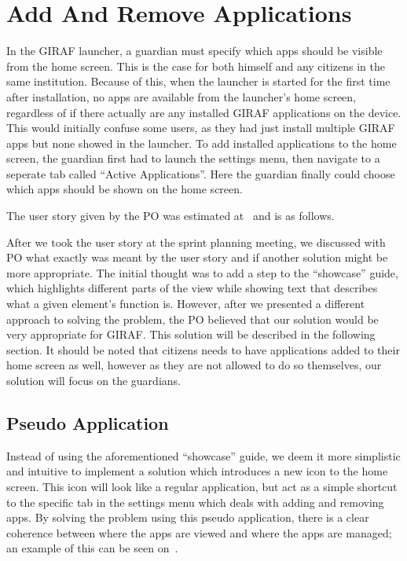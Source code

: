 \section{Add And Remove Applications}
\label{sec:add_and_remove_applications}
In the GIRAF launcher, a guardian must specify which apps should be visible from the home screen.
This is the case for both himself and any citizens in the same institution.
Because of this, when the launcher is started for the first time after installation, no apps are available from the launcher's home screen, regardless of if there actually are any installed GIRAF applications on the device.
This would initially confuse some users, as they had just install multiple GIRAF apps but none showed in the launcher.
To add installed applications to the home screen, the guardian first had to launch the settings menu, then navigate to a seperate tab called \enquote{Active Applications}.
Here the guardian finally could choose which apps should be shown on the home screen.

The user story given by the PO was estimated at \pmedhigh~and is as follows.

After we took the user story at the sprint planning meeting, we discussed with PO what exactly was meant by the user story and if another solution might be more appropriate.
The initial thought was to add a step to the \enquote{showcase} guide, which highlights different parts of the view while showing text that describes what a given element's function is.
However, after we presented a different approach to solving the problem, the PO believed that our solution would be very appropriate for GIRAF.
This solution will be described in the following section. 
It should be noted that citizens needs to have applications added to their home screen as well, however as they are not allowed to do so themselves, our solution will focus on the guardians.

\subsection{Pseudo Application}
\label{sub:pseudo_application}
Instead of using the aforementioned \enquote{showcase} guide, we deem it more simplistic and intuitive to implement a solution which introduces a new icon to the home screen.
This icon will look like a regular application, but act as a simple shortcut to the specific tab in the settings menu which deals with adding and removing apps.
By solving the problem using this pseudo application, there is a clear coherence between where the apps are viewed and where the apps are managed; an example of this can be seen on~.

